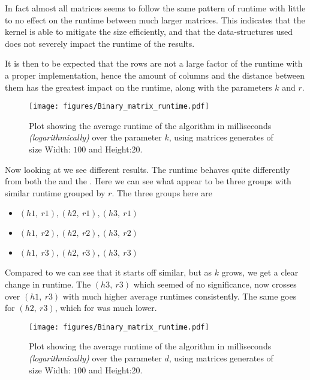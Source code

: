 \documentclass[a4paper]{article}
\begin{document}
In fact almost all matrices seems to follow the same pattern of runtime with little to no effect on the runtime
between much larger matrices. This indicates that the kernel is able to mitigate the size efficiently, and that
the data-structures used does not severely impact the runtime of the results.

It is then to be expected that the rows are not a large factor of the runtime with a proper implementation,
hence the amount of columns and the distance between them has the greatest impact on the runtime, along
with the parameters $k$ and $r$.

\begin{figure}[H]
    \centering
    \texttt{[image: figures/Binary\_matrix\_runtime.pdf]}
    \caption{Plot showing the average runtime of the algorithm in milliseconds \textit{(logarithmically)}
        over the parameter $k$, using matrices generates of size Width: $100$ and Height:$20$.}
    \label{fig:res-100x20k}
\end{figure}

Now looking at  we see different results. The runtime behaves quite differently from
both the  and the . Here we can see what appear to be
three groups with similar runtime grouped by $r$. The three groups here are
\begin{itemize}
    \item $(h1,~r1),(h2,~r1),(h3,~r1)$
    \item $(h1,~r2),(h2,~r2),(h3,~r2)$
    \item $(h1,~r3),(h2,~r3),(h3,~r3)$
\end{itemize}

Compared to  we can see that it starts off similar, but as $k$ grows, we get a
clear change in runtime. The $(h3,~r3)$ which seemed of no significance, now crosses over $(h1,~r3)$
with much higher average runtimes consistently. The same goes for $(h2,~r3)$, which for 
was much lower.

\begin{figure}[H]
    \centering
    \texttt{[image: figures/Binary\_matrix\_runtime.pdf]}
    \caption{Plot showing the average runtime of the algorithm in milliseconds \textit{(logarithmically)}
        over the parameter $d$, using matrices generates of size Width: $100$ and Height:$20$.}
    \label{fig:res-100x20d}
\end{figure}
\end{document}
